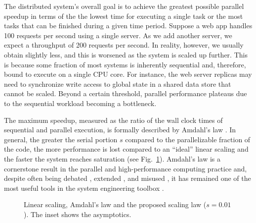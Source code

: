 The distributed system's overall goal is to achieve the greatest possible parallel speedup in terms of the the lowest time for executing a single task or the most tasks that can be finished during a given time period. Suppose a web app handles 100 requests per second using a single server. As we add another server, we expect a throughput of 200 requests per second. In reality, however, we usually obtain slightly less, and this is worsened as the system is scaled up further. This is because some fraction of most systems is inherently sequential and, therefore, bound to execute on a single CPU core. For instance, the web server replicas may need to synchronize write access to global state in a shared data store that cannot be scaled.  Beyond a certain threshold, parallel performance plateaus due to the sequential workload becoming a bottleneck.

The maximum speedup, measured as the ratio of the wall clock times of sequential and parallel execution, is formally described by Amdahl's law \cite{10.1145/1465482.1465560}. In general, the greater the serial portion $s$ compared to the parallelizable fraction of the code, the more performance is lost compared to an ``ideal'' linear scaling and the faster the system reaches saturation (see Fig.~\ref{fig:amdahl}). Amdahl's law is a cornerstone result in the parallel and high-performance computing practice and, despite often being debated \cite{10.1145/42411.42415}, extended \cite{4563876, 6280307,1580395,406581,6163449}, and misused \cite{10.5555/775339.775386}, it has remained one of the most useful tools in the system engineering toolbox \cite{10.5555/1951599}.

\begin{figure}[t]
  \centering
  \begin{small}
  
\end{small}
  \caption{Linear scaling, Amdahl's law and the proposed scaling law ($s=0.01$). The inset shows the asymptotics.}
  \label{fig:amdahl}
\end{figure}

